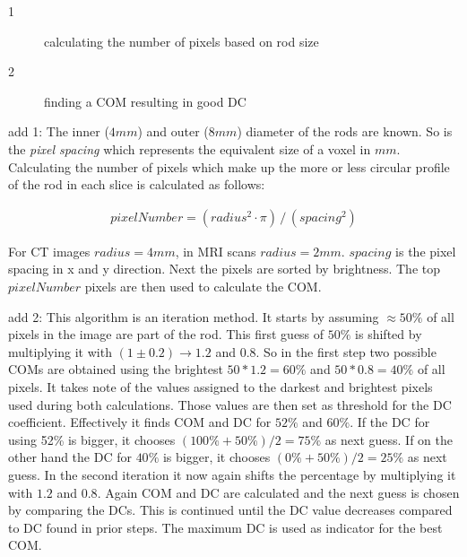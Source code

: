 \begin{description}
 \item[1] calculating the number of pixels based on rod size
 \item[2] finding a COM resulting in good DC
\end{description}

add 1:
The inner ($4mm$) and outer ($8mm$) diameter of the rods are known. So is the \textit{pixel spacing} which represents the equivalent size of a voxel in $mm$.
Calculating the number of pixels which make up the more or less circular profile of the rod in each slice is calculated as follows:

\begin{align}
 pixelNumber = (radius^2 \cdot \pi) \, / \, (spacing^2)
\end{align}

For CT images $radius = 4mm$, in MRI scans $radius = 2mm$. $spacing$ is the pixel spacing in x and y direction.
Next the pixels are sorted by brightness. The top $pixelNumber$ pixels are then used to calculate the COM.

add 2:
This algorithm is an iteration method. It starts by assuming $\approx 50\%$ of all pixels in the image are part of the rod.
This first guess of $50\%$ is shifted by multiplying it with $(1 \pm 0.2) \rightarrow 1.2$ and $0.8$.
So in the first step two possible COMs are obtained using the brightest $50*1.2 = 60\%$ and $50*0.8 = 40\%$ of all pixels.
It takes note of the values assigned to the darkest and brightest pixels used during both calculations.
Those values are then set as threshold for the DC coefficient.
Effectively it finds COM and DC for $52\%$ and $60\%$. If the DC for using 52\% is bigger, it chooses $(100\% + 50\%) / 2 = 75\%$ as next guess.
If on the other hand the DC for $40\%$ is bigger, it chooses $(0\% + 50\%) / 2 = 25\%$ as next guess.
In the second iteration it now again shifts the percentage by multiplying it with $1.2$ and $0.8$. Again COM and DC are calculated and the next guess is chosen by comparing the DCs.
This is continued until the DC value decreases compared to DC found in prior steps. The maximum DC is used as indicator for the best COM.

